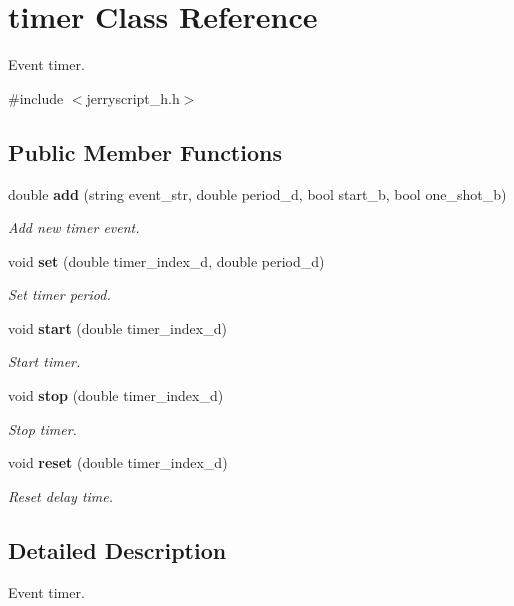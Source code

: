 \section{timer Class Reference}
\label{classtimer}


Event timer.  




{\ttfamily \#include $<$jerryscript\+\_\+h.\+h$>$}

\subsection*{Public Member Functions}
\begin{DoxyCompactItemize}
\item 
double \textbf{ add} (string event\+\_\+str, double period\+\_\+d, bool start\+\_\+b, bool one\+\_\+shot\+\_\+b)
\begin{DoxyCompactList}\small\item\em Add new timer event. \end{DoxyCompactList}\item 
void \textbf{ set} (double timer\+\_\+index\+\_\+d, double period\+\_\+d)
\begin{DoxyCompactList}\small\item\em Set timer period. \end{DoxyCompactList}\item 
void \textbf{ start} (double timer\+\_\+index\+\_\+d)
\begin{DoxyCompactList}\small\item\em Start timer. \end{DoxyCompactList}\item 
void \textbf{ stop} (double timer\+\_\+index\+\_\+d)
\begin{DoxyCompactList}\small\item\em Stop timer. \end{DoxyCompactList}\item 
void \textbf{ reset} (double timer\+\_\+index\+\_\+d)
\begin{DoxyCompactList}\small\item\em Reset delay time. \end{DoxyCompactList}\end{DoxyCompactItemize}


\subsection{Detailed Description}
Event timer. 

